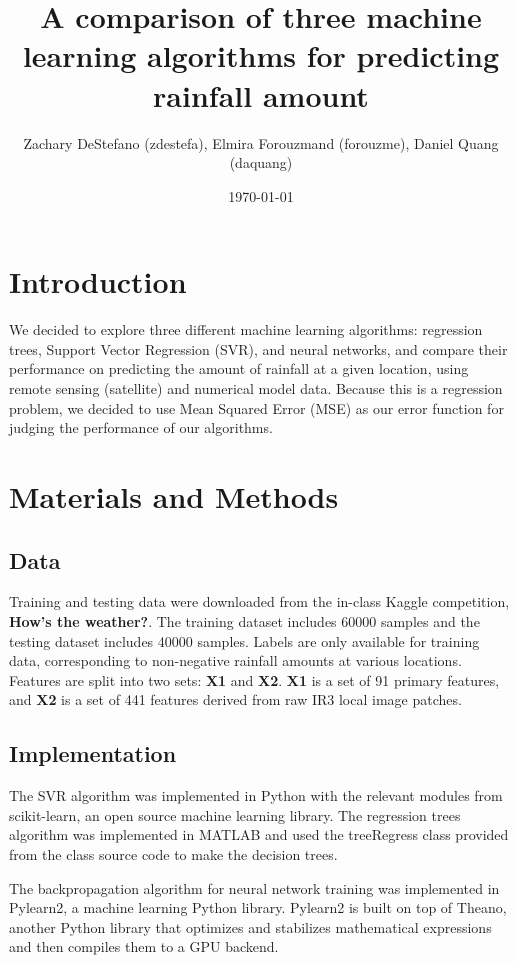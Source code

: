 \documentclass[12pt] {article}
\begin{document}
\title{A comparison of three machine learning algorithms for predicting rainfall amount}
\author{Zachary DeStefano (zdestefa), Elmira Forouzmand (forouzme), Daniel Quang (daquang)}
\date \today
\maketitle
\thispagestyle{empty}
\bigskip
\pagebreak
\setcounter{page}{1}
\section{Introduction}
We decided to explore three different machine learning algorithms: regression trees, Support Vector Regression (SVR), and neural networks, and compare their performance on predicting the amount of rainfall at a given location, using remote sensing (satellite) and numerical model data. Because this is a regression problem, we decided to use Mean Squared Error (MSE) as our error function for judging the performance of our algorithms. 
\section{Materials and Methods}
\subsection{Data}
Training and testing data were downloaded from the in-class Kaggle competition, \textbf{How's the weather?}. The training dataset includes 60000 samples and the testing dataset includes 40000 samples. Labels are only available for training data, corresponding to non-negative rainfall amounts at various locations. Features are split into two sets: \textbf{X1} and \textbf{X2}. \textbf{X1} is a set of 91 primary features, and \textbf{X2} is a set of 441 features derived from raw IR3 local image patches.   

\subsection{Implementation}
The SVR algorithm was implemented in Python with the relevant modules from scikit-learn, an open source machine learning library. The regression trees algorithm was implemented in MATLAB and used the treeRegress class provided from the class source code to make the decision trees. 

The backpropagation algorithm for neural network training was implemented in Pylearn2, a machine learning Python library. Pylearn2 is built on top of Theano, another Python library that optimizes and stabilizes mathematical expressions and then compiles them to a GPU backend. 
\end{document}
